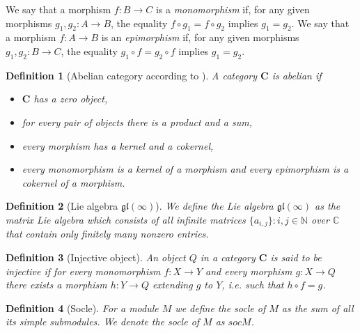 \documentclass[letterpaper,11pt]{article}
\newtheorem{definition}{Definition}
\begin{document}
	We say that a morphism $f:B \rightarrow C$ is a \textit{monomorphism} if, for any given morphisms $g_1, g_2: A \rightarrow B$, the equality $f \circ g_1 = f \circ g_2$ implies $g_1=g_2$. We say that a morphism $f: A \rightarrow B$ is an \textit{epimorphism} if, for any given morphisms $g_1, g_2 : B \rightarrow C$, the equality $g_1 \circ f = g_2 \circ f$ implies $g_1 = g_2$.
		
	\begin{definition}[Abelian category according to \cite{abelian}]
		 A category $\boldsymbol{C}$ is abelian if
		\begin{itemize}
			\item $\boldsymbol{C}$ has a zero object,
			\item for every pair of objects there is a product and a sum,
			\item every morphism has a kernel and a cokernel,
			\item every monomorphism is a kernel of a morphism and every epimorphism is a cokernel of a morphism.
		\end{itemize}
	\end{definition}
	
	\begin{definition}[Lie algebra $\mathfrak{gl}(\infty)$]
		We define the Lie algebra $\mathfrak{gl}(\infty)$ as the matrix Lie algebra which consists of all infinite matrices $\{a_{i,j}\} \colon i,j \in \mathbb{N}$ over $\mathbb{C}$ that contain only finitely many nonzero entries.
	\end{definition}
	
	\begin{definition}[Injective object]
		An object $Q$ in a category $\boldsymbol{C}$ is said to be injective if for every monomorphism $f:X \rightarrow Y$ and every morphism $g: X \rightarrow Q$ there exists a morphism $h:Y \rightarrow Q$ extending $g$ to $Y$, i.e. such that $h \circ f = g$. 
		
		\centering
	\end{definition}
	
	\begin{definition}[Socle]
		For a module $M$ we define the socle of $M$ as the sum of all its simple submodules. We denote the socle of $M$ as $soc M$.
	\end{definition}
	
\end{document}
